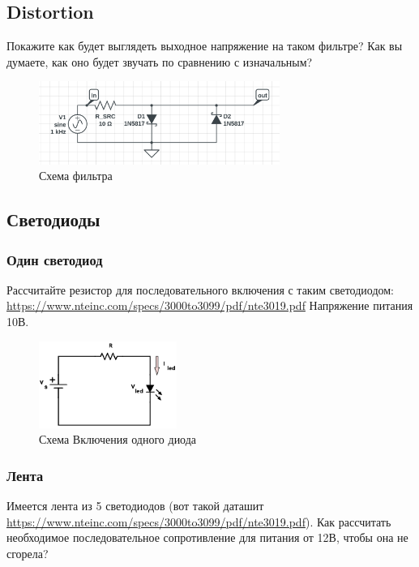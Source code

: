 \documentclass[a4paper,12pt]{article} %
\begin{document}
  \subsection{Distortion}
  Покажите как будет выглядеть выходное напряжение на таком фильтре? Как вы думаете, как оно будет звучать по сравнению с изначальным?
  \begin{figure}[H]
  \centering
  \includegraphics[width=0.7\textwidth]{task1.png}
  \caption{Схема фильтра}
  \end{figure}


  \subsection{Светодиоды}

  \subsubsection{Один светодиод}
  Рассчитайте резистор для последовательного включения с таким светодиодом: \url{https://www.nteinc.com/specs/3000to3099/pdf/nte3019.pdf} Напряжение питания 10В.

  \begin{figure}[H]
  \centering
  \includegraphics[width=0.4\textwidth]{external.png}
  \caption{Схема Включения одного диода}
  \end{figure}

  \subsubsection{Лента}
  Имеется лента из 5 светодиодов (вот такой даташит \url{https://www.nteinc.com/specs/3000to3099/pdf/nte3019.pdf}). Как рассчитать необходимое последовательное сопротивление для питания от 12В, чтобы она не сгорела?
\end{document}
